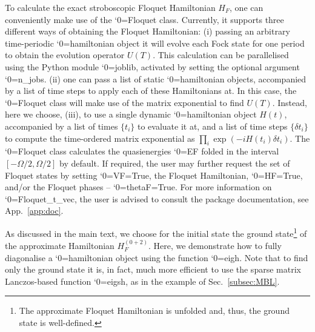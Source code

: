 \documentclass{SciPost}
\newcommand\0{\scalebox{-1}[1]{0}}
\let\svttfamily\ttfamily
\renewcommand\ttfamily{\svttfamily\catcode`0=\active }
\renewcommand\texttt{\bgroup\ttfamily\texttthelp}
\def\texttthelp#1{#1\egroup}
\begin{document}

%
To calculate the exact stroboscopic Floquet Hamiltonian $H_F$, one can conveniently make use of the \texttt{Floquet} class. Currently, it supports three different ways of obtaining the Floquet Hamiltonian: (i) passing an arbitrary time-periodic \texttt{hamiltonian} object it will evolve each Fock state for one period to obtain the evolution operator $U(T)$. This calculation can be parallelised using the Python module \texttt{joblib}, activated by setting the optional argument \texttt{n\_jobs}. (ii) one can pass a list of static \texttt{hamiltonian} objects, accompanied by a list of time steps to apply each of these Hamiltonians at. In this case, the \texttt{Floquet} class will make use of the matrix exponential to find $U(T)$. Instead, here we choose, (iii), to use a single dynamic \texttt{hamiltonian} object $H(t)$, accompanied by a list of times $\{t_i\}$ to evaluate it at, and a list of time steps $\{\delta t_i\}$ to compute the time-ordered matrix exponential as $\prod_i \exp(-iH(t_i)\delta t_i)$. The \texttt{Floquet} class calculates the quasienergies \texttt{EF} folded in the interval $[-\Omega/2,\Omega/2]$ by default. If required, the user may further request the set of Floquet states by setting \texttt{VF=True}, the Floquet Hamiltonian, \texttt{HF=True}, and/or the Floquet phases -- \texttt{thetaF=True}. For more information on \texttt{Floquet\_t\_vec}, the user is advised to consult the package documentation, see App.~\ref{app:doc}.

%
As discussed in the main text, we choose for the initial state the ground state\footnote{The approximate Floquet Hamiltonian is unfolded\cite{weinberg_FAPT} and, thus, the ground state is well-defined.} of the approximate Hamiltonian $H_F^{(0+2)}$. Here, we demonstrate how to fully diagonalise a \texttt{hamiltonian} object using the function \texttt{eigh}. Note that to find only the ground state it is, in fact, much more efficient to use the sparse matrix Lanczos-based function \texttt{eigsh}, as in the example of Sec.~\ref{subsec:MBL}.

%
\end{document}
